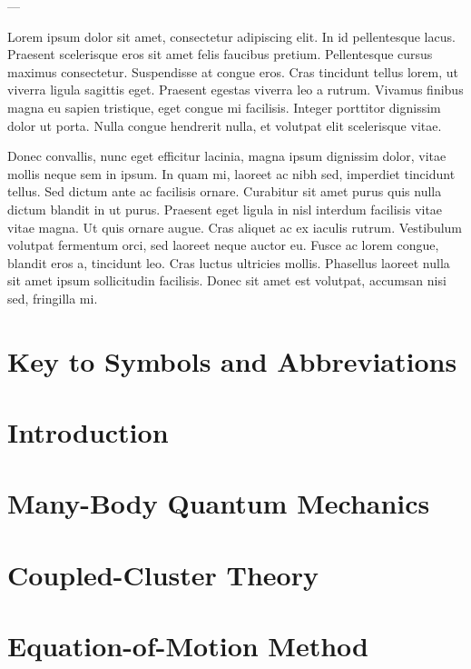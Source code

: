 \documentclass[dissertation]{msudissertation}
\begin{document}
---

Lorem ipsum dolor sit amet, consectetur adipiscing elit. In id pellentesque lacus. Praesent scelerisque eros sit amet felis faucibus pretium. Pellentesque cursus maximus consectetur. Suspendisse at congue eros. Cras tincidunt tellus lorem, ut viverra ligula sagittis eget. Praesent egestas viverra leo a rutrum. Vivamus finibus magna eu sapien tristique, eget congue mi facilisis. Integer porttitor dignissim dolor ut porta. Nulla congue hendrerit nulla, et volutpat elit scelerisque vitae.

Donec convallis, nunc eget efficitur lacinia, magna ipsum dignissim dolor, vitae mollis neque sem in ipsum. In quam mi, laoreet ac nibh sed, imperdiet tincidunt tellus. Sed dictum ante ac facilisis ornare. Curabitur sit amet purus quis nulla dictum blandit in ut purus. Praesent eget ligula in nisl interdum facilisis vitae vitae magna. Ut quis ornare augue. Cras aliquet ac ex iaculis rutrum. Vestibulum volutpat fermentum orci, sed laoreet neque auctor eu. Fusce ac lorem congue, blandit eros a, tincidunt leo. Cras luctus ultricies mollis. Phasellus laoreet nulla sit amet ipsum sollicitudin facilisis. Donec sit amet est volutpat, accumsan nisi sed, fringilla mi.

\tableofcontents
\listoftables
\listoffigures

\chapter{Key to Symbols and Abbreviations}


\mainmatter

\chapter{Introduction} \label{chapter:introduction}


\chapter{Many-Body Quantum Mechanics} \label{chapter:manybody}


\chapter{Coupled-Cluster Theory} \label{chapter:cc}


\chapter{Equation-of-Motion Method} \label{chapter:eom}

\end{document}
